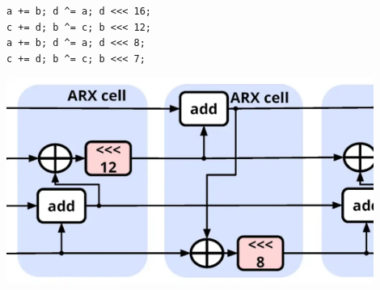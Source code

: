 \begin{minipage}[c]{0.48\textwidth}
        \verb|a += b; d ^= a; d <<< 16;| \\
        \verb|c += d; b ^= c; b <<< 12;| \\
        \verb|a += b; d ^= a; d <<< 8;| \\
        \verb|c += d; b ^= c; b <<< 7;|
\end{minipage} \begin{minipage}[c]{0.48\textwidth}
    \centering
    \includegraphics[width=0.9\textwidth]{figures/fig7-chacha20-1024x576.png}
\end{minipage}

